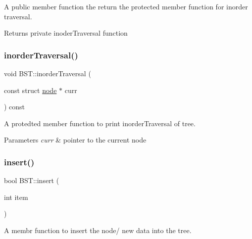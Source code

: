 A public member function the return the protected member function for inorder traversal. 

\begin{DoxyReturn}{Returns}
private inoder\+Traversal function 
\end{DoxyReturn}
\mbox{\label{classBST_a3ed595e801648f5c145f145c371489b4}} 
\subsubsection{\texorpdfstring{inorder\+Traversal()}{inorderTraversal()}\hspace{0.1cm}{\footnotesize\ttfamily [2/2]}}
{\footnotesize\ttfamily void B\+S\+T\+::inorder\+Traversal (\begin{DoxyParamCaption}\item[{const struct \hyperlink{structnode}{node} $\ast$}]{curr }\end{DoxyParamCaption}) const\hspace{0.3cm}{\ttfamily [protected]}}



A protedted member function to print inorder\+Traversal of tree. 


\begin{DoxyParams}{Parameters}
{\em curr} & pointer to the current node \\
\hline
\end{DoxyParams}
\mbox{\label{classBST_a5ab5b12888965cf4a366c9547361bc46}} 
\subsubsection{\texorpdfstring{insert()}{insert()}\hspace{0.1cm}{\footnotesize\ttfamily [1/2]}}
{\footnotesize\ttfamily bool B\+S\+T\+::insert (\begin{DoxyParamCaption}\item[{int}]{item }\end{DoxyParamCaption})\hspace{0.3cm}{\ttfamily [inline]}}



A membr function to insert the node/ new data into the tree. 


